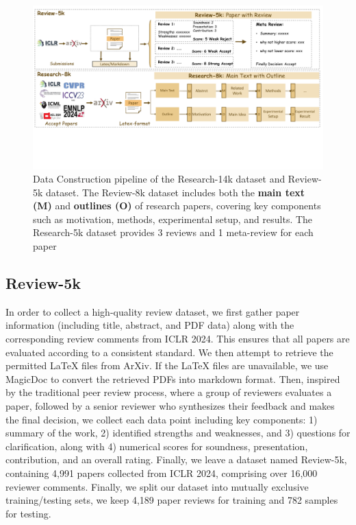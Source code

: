 \documentclass{article} %
\begin{document}
\begin{figure}[t]
    \centering
\includegraphics[width=\textwidth]{dataset_figure.pdf}
    \vspace{-0.7cm}
    \caption{Data Construction pipeline of the Research-14k dataset and Review-5k dataset. The Review-8k dataset includes both the \textbf{main text (M)} and \textbf{outlines (O)} of research papers, covering key components such as motivation, methods, experimental setup, and results. The Research-5k dataset provides 3 reviews and 1 meta-review for each paper}
    \vspace{-0.4cm}
    \label{fig:dataconstruction}
\end{figure}

\subsection{Review-5k}


In order to collect a high-quality review dataset, we first gather paper information (including title, abstract, and PDF data) along with the corresponding review comments from ICLR 2024. This ensures that all papers are evaluated according to a consistent standard. We then attempt to retrieve the permitted LaTeX files from ArXiv. If the LaTeX files are unavailable, we use MagicDoc to convert the retrieved PDFs into markdown format. Then, inspired by the traditional peer review process, where a group of reviewers evaluates a paper, followed by a senior reviewer who synthesizes their feedback and makes the final decision, we collect each data point including key components: 1) summary of the work, 2) identified strengths and weaknesses, and 3) questions for clarification, along with 4) numerical scores for soundness, presentation, contribution, and an overall rating. Finally, we leave a dataset named Review-5k, containing 4,991 papers collected from ICLR 2024, comprising over 16,000 reviewer comments. Finally, we split our dataset into mutually exclusive training/testing sets, we keep 4,189 paper reviews for training and 782 samples for testing. 
\end{document}
